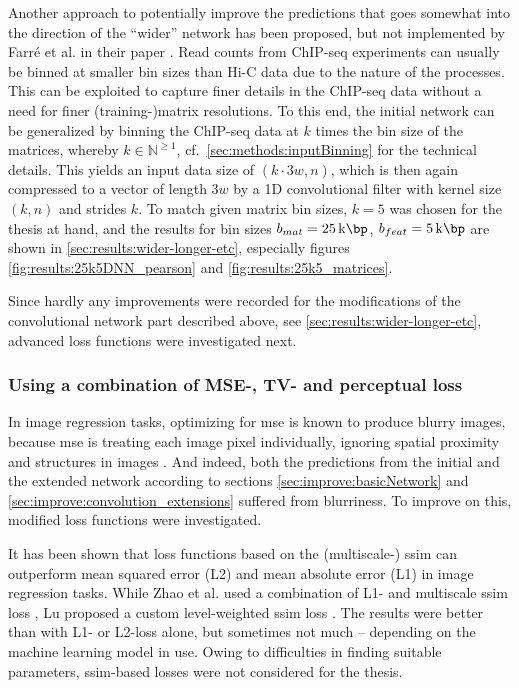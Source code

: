 Another approach to potentially improve the predictions that goes somewhat into
the direction of the ``wider'' network has been proposed, but not implemented by Farr\'e et al. 
in their paper \cite{Farre2018a}.
Read counts from ChIP-seq experiments can usually be binned at smaller bin sizes than Hi-C data due to the nature of 
the processes. 
This can be exploited to capture finer details in the ChIP-seq data without a need for finer (training-)matrix resolutions.
To this end, the initial network can be generalized by binning the ChIP-seq data at $k$ times the bin size of the matrices, 
whereby $k \in \mathbb{N}^{\geq1}$, cf.~\cref{sec:methods:inputBinning} for the technical details.
This yields an input data size of $(k \cdot 3w, n)$, which is then again compressed to a vector of length $3w$ 
by a 1D convolutional filter with kernel size $(k, n)$ and strides $k$. 
To match given matrix bin sizes, $k=5$ was chosen for the thesis at hand, 
and the results for bin sizes $b_{mat}=\SI{25}{\kilo\bp}$, $b_{feat}=\SI{5}{\kilo\bp}$ are shown in \cref{sec:results:wider-longer-etc},
especially figures \ref{fig:results:25k5DNN_pearson} and \ref{fig:results:25k5_matrices}.

Since hardly any improvements were recorded for the modifications of the convolutional network part described above, 
see \cref{sec:results:wider-longer-etc}, advanced loss functions were investigated next.

\subsubsection{Using a combination of MSE-, TV- and perceptual loss} \label{sec:improve:combined_loss}
In image regression tasks, optimizing for \acrfull{mse} is known to produce blurry images,
because \acrshort{mse} is treating each image pixel individually, ignoring spatial proximity and structures in images \cite{Isola2017,Lu2019}.
And indeed, both the predictions from the initial and the extended network according to sections \ref{sec:improve:basicNetwork} and \ref{sec:improve:convolution_extensions} 
suffered from blurriness. 
To improve on this, modified loss functions were investigated. 

It has been shown that loss functions based on the (multiscale-) \acrfull{ssim} \cite{Wang2003}
can outperform mean squared error (L2) and mean absolute error (L1) in image regression tasks.
While Zhao et al. used a combination of L1- and multiscale \acrshort{ssim} loss \cite{Zhao2017},
Lu proposed a custom level-weighted \acrshort{ssim} loss \cite{Lu2019}.
The results were better than with L1- or L2-loss alone, but sometimes not much -- depending on the machine learning model in use.
Owing to difficulties in finding suitable parameters, \acrshort{ssim}-based losses were not considered for the thesis.

